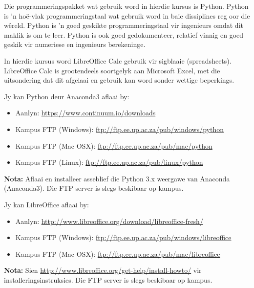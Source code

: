         Die programmeringspakket wat gebruik word in hierdie kursus is Python.
        Python is 'n ho\"{e}-vlak programmeringstaal wat gebruik word in baie
        dissiplines reg oor die w\^{e}reld. Python is 'n goed geskikte
        programmeringstaal vir ingenieurs omdat dit maklik is om te leer.
        Python is ook goed gedokumenteer, relatief vinnig en goed geskik vir
        numeriese en ingenieurs berekeninge.

        In hierdie kursus word LibreOffice Calc gebruik vir sigblaaie
        (spreadsheets). LibreOffice Calc is grootendeels soortgelyk aan
        Microsoft Excel, met die uitsondering dat dit afgelaai en gebruik kan
        word sonder wettige beperkings.

        \noindent
        Jy kan Python deur Anaconda3 aflaai by:
        \begin{itemize}
            \item Aanlyn: \url{https://www.continuum.io/downloads}
            \item Kampus FTP (Windows): \url{ftp://ftp.ee.up.ac.za/pub/windows/python}
            \item Kampus FTP (Mac OSX): \url{ftp://ftp.ee.up.ac.za/pub/mac/python}
            \item Kampus FTP (Linux): \url{ftp://ftp.ee.up.ac.za/pub/linux/python}
        \end{itemize}
        \textbf{Nota:} Aflaai en installeer asseblief die Python 3.x weergawe
        van Anaconda (Anaconda3). Die FTP server is slegs beskibaar op kampus.

        \noindent
        Jy kan LibreOffice aflaai by:
        \begin{itemize}
            \item Aanlyn: \url{http://www.libreoffice.org/download/libreoffice-fresh/}
            \item Kampus FTP (Windows): \url{ftp://ftp.ee.up.ac.za/pub/windows/libreoffice}
            \item Kampus FTP (Mac OSX): \url{ftp://ftp.ee.up.ac.za/pub/mac/libreoffice}
        \end{itemize}
        \textbf{Nota:} Sien
        \url{http://www.libreoffice.org/get-help/install-howto/} vir
        installeringsinstruksies. Die FTP server is slegs beskibaar op kampus.
